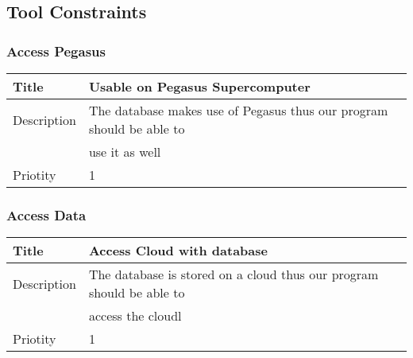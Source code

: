 \documentclass{article}
\begin{document}
    
	\subsection{Tool Constraints}
  		\subsubsection{Access Pegasus}
			\begin{table}[h!]
			\centering
				\label{system-constraints/hardware/computation-table}
				\begin{tabular}{|l|l|}
				\hline
					Title		&Usable on Pegasus Supercomputer \\ \hline
					Description	&The database makes use of Pegasus thus our program should be able to\\ 
							&use it as well \\ \hline
					Priotity	&1  \\ \hline
				\end{tabular}
			\end{table}
		\subsubsection{Access Data}
			\begin{table}[h!]
			\centering
				\label{system-constraints/hardware/computation-table}
				\begin{tabular}{|l|l|}
				\hline
					Title		&Access Cloud with database \\ \hline
					Description	&The database is stored on a cloud thus our program should be able to  \ \ \\
							& access the cloudl \\ \hline
					Priotity	&1  \\ \hline
				\end{tabular}
			\end{table}
\end{document}
